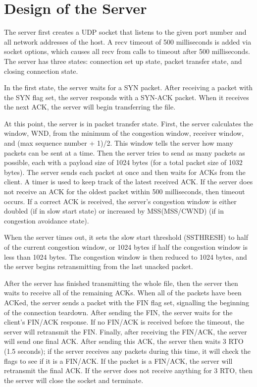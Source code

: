 \documentclass{article}
\begin{document}
\section{Design of the Server}
    The server first creates a UDP socket that listens to the given port number
    and all network addresses of the host. A recv timeout of 500 milliseconds
    is added via socket options, which causes all recv from calls to timeout
    after 500 milliseconds. The server has three states: connection set up
    state, packet transfer state, and closing connection state.

    In the first state, the server waits for a SYN packet. After receiving a
    packet with the SYN flag set, the server responds with a SYN-ACK packet.
    When it receives the next ACK, the server will begin transferring the file.

    At this point, the server is in packet transfer state. First, the server
    calculates the window, WND, from the minimum of the congestion window,
    receiver window, and (max sequence number + 1)/2. This window tells the
    server how many packets can be sent at a time. Then the server tries to
    send as many packets as possible, each with a payload size of 1024 bytes
    (for a total packet size of 1032 bytes). The server sends each packet at
    once and then waits for ACKs from the client. A timer is used to keep track
    of the latest received ACK. If the server does not receive an ACK for the
    oldest packet within 500 milliseconds, then timeout occurs. If a correct
    ACK is received, the server's congestion window is either doubled (if in
    slow start state) or increased by MSS(MSS/CWND) (if in congestion avoidance
    state).

    When the server times out, it sets the slow start threshold (SSTHRESH) to
    half of the current congestion window, or 1024 bytes if half the congestion
    window is less than 1024 bytes. The congestion window is then reduced to
    1024 bytes, and the server begins retransmitting from the last unacked
    packet.

    After the server has finished transmitting the whole file, then the server
    then waits to receive all of the remaining ACKs. When all of the packets
    have been ACKed, the server sends a packet with the FIN flag set,
    signalling the beginning of the connection teardown. After sending the FIN,
    the server waits for the client's FIN/ACK response. If no FIN/ACK is
    received before the timeout, the server will retransmit the FIN. Finally,
    after receiving the FIN/ACK, the server will send one final ACK. After
    sending this ACK, the server then waits 3 RTO (1.5 seconds); if the server
    receives any packets during this time, it will check the flags to see if it
    is a FIN/ACK. If the packet is a FIN/ACK, the server will retransmit the
    final ACK. If the server does not receive anything for 3 RTO, then the
    server will close the socket and terminate.
\end{document}
